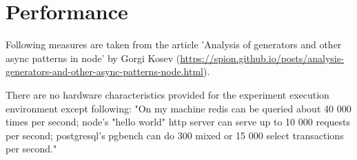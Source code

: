



\section{Performance}
Following measures are taken from the article 'Analysis of generators and other async patterns in node' by Gorgi Kosev (\url{https://spion.github.io/posts/analysis-generators-and-other-async-patterns-node.html}). 

There are no hardware characteristics provided for the experiment execution environment except following: "On my machine redis can be queried about 40 000 times per second; node's "hello world" http server can serve up to 10 000 requests per second; postgresql's pgbench can do 300 mixed or 15 000 select transactions per second." \cite{asyncPerformance_2}

